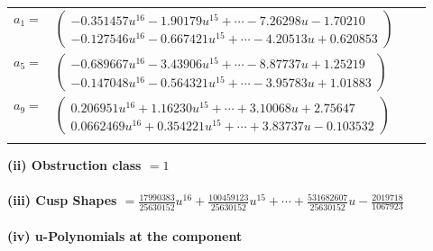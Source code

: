 \documentclass[1p]{elsarticle_modified}
\theoremstyle{definition}
\begin{document}
\begin{tabular}{m{7pt} m{180pt} m{7pt} m{180pt} }
\flushright $a_{1}=$&$\begin{pmatrix}-0.351457 u^{16}-1.90179 u^{15}+\cdots-7.26298 u-1.70210\\-0.127546 u^{16}-0.667421 u^{15}+\cdots-4.20513 u+0.620853\end{pmatrix}$ \\
\flushright $a_{5}=$&$\begin{pmatrix}-0.689667 u^{16}-3.43906 u^{15}+\cdots-8.87737 u+1.25219\\-0.147048 u^{16}-0.564321 u^{15}+\cdots-3.95783 u+1.01883\end{pmatrix}$ \\
\flushright $a_{9}=$&$\begin{pmatrix}0.206951 u^{16}+1.16230 u^{15}+\cdots+3.10068 u+2.75647\\0.0662469 u^{16}+0.354221 u^{15}+\cdots+3.83737 u-0.103532\end{pmatrix}$\\&\end{tabular}
\flushleft \textbf{(ii) Obstruction class $= 1$}\\~\\
\flushleft \textbf{(iii) Cusp Shapes $= \frac{17990383}{25630152} u^{16}+\frac{100459123}{25630152} u^{15}+\cdots+\frac{531682607}{25630152} u-\frac{2019718}{1067923}$}\\~\\
\newpage\renewcommand{\arraystretch}{1}
\flushleft \textbf{(iv) u-Polynomials at the component}\newline \\
\end{document}
